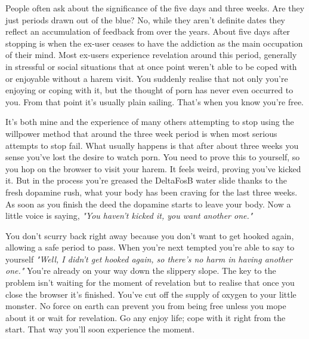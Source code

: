 \documentclass[easypeasy.tex]{subfiles}
\begin{document}
People often ask about the significance of the five days and three weeks. Are they just periods drawn out of the blue? No, while they aren't definite dates they reflect an accumulation of feedback from over the years. About five days after stopping is when the ex-user ceases to have the addiction as the main occupation of their mind. Most ex-users experience revelation around this period, generally in stressful or social situations that at once point weren't able to be coped with or enjoyable without a harem visit. You suddenly realise that not only you're enjoying or coping with it, but the thought of porn has never even occurred to you. From that point it's usually plain sailing. That's when you know you're free.

It's both mine and the experience of many others attempting to stop using the willpower method that around the three week period is when most serious attempts to stop fail. What usually happens is that after about three weeks you sense you've lost the desire to watch porn. You need to prove this to yourself, so you hop on the browser to visit your harem. It feels weird, proving you've kicked it. But in the process you're greased the DeltaFosB water slide thanks to the fresh dopamine rush, what your body has been craving for the last three weeks. As soon as you finish the deed the dopamine starts to leave your body. Now a little voice is saying, \textit{"You haven't kicked it, you want another one."}

You don't scurry back right away because you don't want to get hooked again, allowing a safe period to pass. When you're next tempted you're able to say to yourself \textit{"Well, I didn't get hooked again, so there's no harm in having another one."} You're already on your way down the slippery slope. The key to the problem isn't waiting for the moment of revelation but to realise that once you close the browser it's finished. You've cut off the supply of oxygen to your little monster. No force on earth can prevent you from being free unless you mope about it or wait for revelation. Go any enjoy life; cope with it right from the start. That way you'll soon experience the moment.
\end{document}
